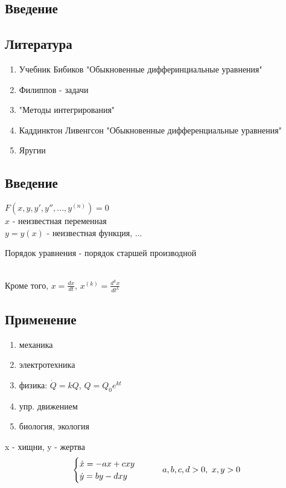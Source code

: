\documentclass[main]{subfiles}
\begin{document}
\begin{lect}
    \section{Введение}
    \subsection{Литература}
    \begin{enumerate}
        \item Учебник Бибиков "Обыкновенные дифферинциальные уравнения"
        \item Филиппов - задачи
        \item "Методы интегрирования"
        \item Каддинктон Ливенгсон "Обыкновенные дифференциальные уравнения"
        \item Яругии
    \end{enumerate}

    \subsection{Введение}
    $F(x,y,y',y'',...,y^{(n)}) = 0$\\
    $x$ - неизвестная переменная\\
    $y = y(x)$ - неизвестная функция, ...

    \begin{definition}
    Порядок уравнения - порядок старшей производной
    \end{definition}
    \\
    Кроме того, $x = \frac{dx}{dt}$, $x^{(k)} = \frac{d^k x}{dt^k}$

    \subsection{Применение}
    \begin{enumerate}
        \item механика
        \item электротехника
        \item физика: $\dot{Q} = k Q$, $Q = Q_0 e^{kt}$
        \item упр. движением
        \item биология, экология
    \end{enumerate}

    \begin{example}[из биологии]
        x - хищни, y - жертва
       \[\begin{cases}
           \dot{x} = -ax+cxy\\
           \dot{y} = by-dxy
       \end{cases} \qquad a,b,c,d > 0,\ x,y>0\]
    \end{example}


\end{lect}
\end{document}
